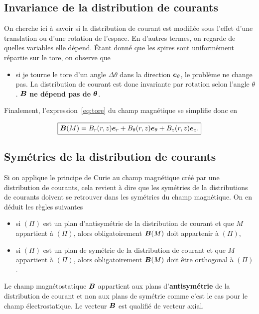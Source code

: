\subsection{Invariance de la distribution de courants}
On cherche ici à savoir si la distribution de courant est modifiée sous l'effet
d'une translation ou d'une rotation de l'espace. En d'autres termes, on regarde
de quelles variables elle dépend. Étant donné que les spires sont uniformément
répartie sur le tore, on observe que

\begin{itemize}
	\item  si je tourne le tore d'un angle $\Delta \theta$ dans la
	  direction $\etheta$, le problème
	  ne change pas. La distribution de courant est donc invariante 
	  par rotation selon l'angle $\theta$. $\vecb$ \textbf{ne dépend pas de
	  $\mitbf{\theta}$}.
\end{itemize}

Finalement, l'expression~\ref{eq:tore} du champ magnétique se simplifie donc en 

\begin{equation*}
	\boxed{\vecb(M) = B_r(r,z)\er + B_\theta(r,z)\etheta + B_z(r,z)\ez.}
\end{equation*}
\subsection{Symétries de la distribution de courants}

Si on applique le principe de Curie au champ magnétique créé par une distribution 
de courants, cela revient à dire que les symétries de la distributions de 
courants doivent se retrouver dans les symétries du champ magnétique. On en 
déduit les règles suivantes

\begin{defn}
\begin{itemize}
  \item si $(\Pi)$ est un plan d'antisymétrie de la distribution de courant et que 
    $M$ appartient à $(\Pi)$, alors obligatoirement $\vecb(M)$ doit 
    appartenir à $(\Pi)$,
  \item si $(\Pi)$ est un plan de symétrie de la distribution de courant 
    et que $M$ appartient à $(\Pi)$, alors obligatoirement $\vecb(M)$ doit 
    être orthogonal à $(\Pi)$.
\end{itemize}
\end{defn}

\begin{rema}
	Le champ magnétostatique $\vecb$ appartient aux plans d'\textbf{antisymétrie}
	de la distribution de courant et non aux plans de symétrie comme
	c'est le cas pour le champ électrostatique. Le vecteur $\vecb$ est 
	qualifié de vecteur axial.
\end{rema}


